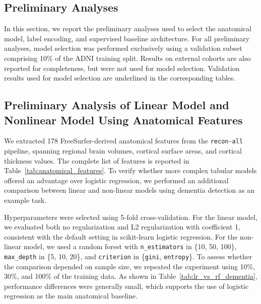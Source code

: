 \documentclass[pdflatex,sn-nature]{sn-jnl}%
\newif\ifhighlight
\newcommand{\revdel}[1]{\ifhighlight{\color{red}\sout{#1}}\fi}
\theoremstyle{thmstyleone}%
\theoremstyle{thmstyletwo}%
\theoremstyle{thmstylethree}%
\begin{document}
\begin{appendices}
\section{Preliminary Analyses}
\label{sec:preliminary_analyses}

In this section\revdel{ of the Appendix}, we report the preliminary analyses used to select the anatomical model, label encoding, and supervised baseline architecture. For all preliminary analyses, model selection was performed exclusively using a validation subset comprising 10\% of the ADNI training split. Results on external cohorts are also reported for completeness, but were not used for model selection. Validation results used for model selection are underlined in the corresponding tables.

\subsection{Preliminary Analysis of Linear Model and Nonlinear Model Using Anatomical Features}
\label{sec:lr_vs_rf}

We extracted 178 FreeSurfer-derived anatomical features from the \texttt{recon-all} pipeline, spanning regional brain volumes, cortical surface areas, and cortical thickness values. The complete list of features is reported in Table~\ref{tab:anatomical_features}. To verify whether more complex tabular models offered an advantage over logistic regression, we performed an additional comparison between linear and non-linear models using dementia detection as an example task.

Hyperparameters were selected using 5-fold cross-validation. For the linear model, we evaluated both no regularization and L2 regularization with coefficient 1, consistent with the default setting in scikit-learn logistic regression. For the non-linear model, we used a random forest with \texttt{n\_estimators} in \{10, 50, 100\}, \texttt{max\_depth} in \{5, 10, 20\}, and \texttt{criterion} in \{\texttt{gini}, \texttt{entropy}\}. To assess whether the comparison depended on sample size, we repeated the experiment using 10\%, 30\%, and 100\% of the training data. As shown in Table~\ref{tab:lr_vs_rf_dementia}, performance differences were generally small, which supports the use of logistic regression as the main anatomical baseline.


\begin{table}[!ht]
\centering

\setlength{\tabcolsep}{4pt}
\renewcommand{\arraystretch}{1.15}


\end{table}
\end{appendices}
\end{document}
